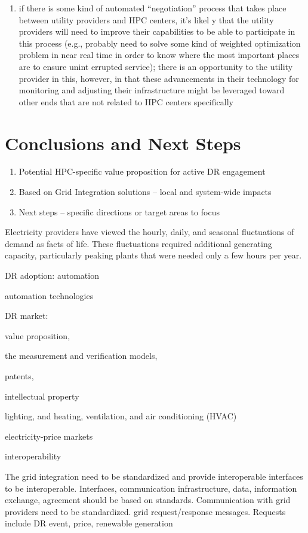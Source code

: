 \documentclass{llncs}
\begin{document}
\begin{enumerate}
\item if there is some kind of automated ``negotiation'' process that takes place between utility providers and HPC centers, it's likel
y that the utility providers will need to improve their capabilities to be able to participate in this process (e.g., probably need to
solve some kind of weighted optimization problem in near real time in order to know where the most important places are to ensure unint
errupted service); there is an opportunity to the utility provider in this, however, in that these advancements in their technology for
 monitoring and adjusting their infrastructure might be leveraged toward other ends that are not related to HPC centers specifically
\end{enumerate}


\section{Conclusions and Next Steps}

\begin{enumerate}
\item Potential HPC-specific value proposition for active DR engagement
\item Based on Grid Integration solutions -- local and system-wide impacts
\item Next steps -- specific directions or target areas to focus
\end{enumerate}

Electricity providers have viewed the hourly, daily, and seasonal
fluctuations of demand as facts of life. These fluctuations required
additional generating capacity, particularly peaking plants that were needed
only a few hours per year.

DR adoption: automation

automation technologies

DR market:

value proposition,

the measurement and verification models,

patents,

intellectual property

lighting, and heating, ventilation, and air conditioning (HVAC)

electricity-price markets

interoperability

The grid integration need to be standardized and provide interoperable
interfaces to be interoperable. Interfaces, communication infrastructure,
data, information exchange, agreement should be based on standards.
Communication with grid providers need to be standardized. grid
request/response messages. Requests include DR event, price, renewable
generation
\end{document}
